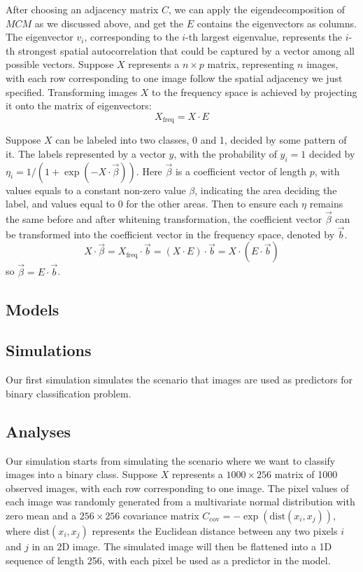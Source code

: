 \documentclass[12pt]{article}
\begin{document}
After choosing an adjacency matrix \( C \), we can apply the eigendecomposition of \( M C M \) as we discussed above, and get the \( E \) contains the eigenvectors as columns. The eigenvector \( v_i \), corresponding to the \( i \)-th largest eigenvalue, represents the \( i \)-th strongest spatial autocorrelation that could be captured by a vector among all possible vectors. Suppose \( X \) represents a \( n \times p \) matrix, representing \( n \) images, with each row corresponding to one image follow the spatial adjacency we just specified. Transforming images \( X \) to the frequency space is achieved by projecting it onto the matrix of eigenvectors:
\[
  X_{\text{freq}} = X \cdot E
\]

Suppose \( X \) can be labeled into two classes, 0 and 1, decided by some pattern of it. The labels represented by a vector \( y \), with the probability of \( y_i = 1 \) decided by \( \eta_i = 1 / (1 + \exp(-X \cdot \vec{\beta})) \). Here \( \vec{\beta} \) is a coefficient vector of length \( p \), with values equals to a constant non-zero value \( \beta \), indicating the area deciding the label, and values equal to 0 for the other areas. Then to ensure each \( \eta \) remains the same before and after whitening transformation, the coefficient vector \( \vec{\beta} \) can be transformed into the coefficient vector in the frequency space, denoted by \( \vec{b} \).
\[
  X \cdot \vec{\beta} = X_{\text{freq}} \cdot \vec{b} = (X \cdot E) \cdot \vec{b} = X \cdot (E \cdot \vec{b})
\]
so \( \vec{\beta} = E \cdot \vec{b} \).


\subsection{Models}

\subsection{Simulations}

Our first simulation simulates the scenario that images are used as predictors for binary classification problem.

\subsection{Analyses}


Our simulation starts from simulating the scenario where we want to classify images into a binary class. Suppose \( X \) represents a \( 1000 \times 256 \) matrix of 1000 observed images, with each row corresponding to one image. The pixel values of each image was randomly generated from a multivariate normal distribution with zero mean and a \( 256 \times 256 \) covariance matrix \( C_{\text{cov}} = - \exp (\text{dist} (x_i, x_j)) \), where \( \text{dist} (x_i, x_j) \) represents the Euclidean distance between any two pixels \( i \) and \( j \) in an 2D image. The simulated image will then be flattened into a 1D sequence of length 256, with each pixel be used as a predictor in the model.
\end{document}
